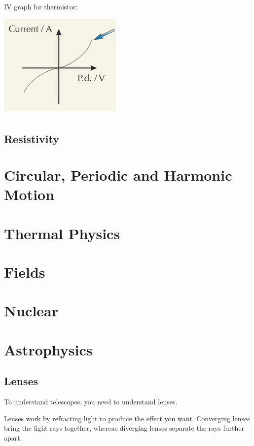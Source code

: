\documentclass[a4paper, 12pt]{article}
\begin{document}
IV graph for thermistor:

\begin{center}
\includegraphics[]{images/thermistorIV.png}
\end{center}

\subsection{Resistivity}

\newpage
\section{Circular, Periodic and Harmonic Motion}

\newpage
\section{Thermal Physics}

\newpage
\section{Fields}

\newpage
\section{Nuclear}

\newpage
\section{Astrophysics}

\subsection{Lenses}

To understand telescopes, you need to understand lenses.

Lenses work by refracting light to produce the effect you want. Converging lenses bring the light rays together, whereas diverging lenses separate the rays further apart.
\end{document}
